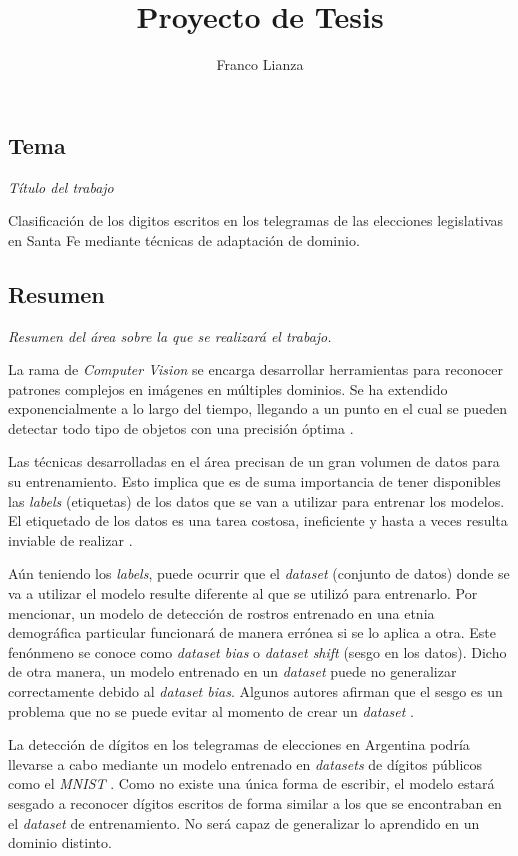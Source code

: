 \documentclass[a4paper, twoside]{report}
\title{Proyecto de Tesis}
\author{Franco Lianza}
\begin{document}

\newpage

\subsection*{Tema}
{\it Título del trabajo}

Clasificaci\'on de los digitos escritos en los telegramas de las elecciones
legislativas en Santa Fe mediante t\'ecnicas de adaptaci\'on de dominio.

\subsection*{Resumen}
{\it Resumen del área sobre la que se realizará el trabajo.}

La rama de {\it Computer Vision} se encarga desarrollar herramientas para
reconocer patrones complejos en im\'agenes en m\'ultiples dominios. Se ha
extendido exponencialmente a lo largo del tiempo, llegando a un punto en el
cual se pueden detectar todo tipo de objetos con una precisi\'on \'optima
\cite{szeliski2010computer}.

Las t\'ecnicas desarrolladas en el \'area precisan de un gran volumen de datos
para su entrenamiento. Esto implica que es de suma importancia de tener
disponibles las {\it labels} (etiquetas) de los datos que se van a utilizar
para entrenar los modelos. El etiquetado de los datos es una tarea costosa,
ineficiente y hasta a veces resulta inviable de realizar \cite{reis2022data}.

A\'un teniendo los {\it labels}, puede ocurrir que el {\it dataset} (conjunto
de datos) donde se va a utilizar el modelo resulte diferente al que se utilizó
para entrenarlo. Por mencionar, un modelo de detecci\'on de rostros entrenado
en una etnia demogr\'afica particular funcionar\'a de manera err\'onea si se lo
aplica a otra. Este fen\'onmeno se conoce como {\it dataset bias} o {\it
		dataset shift} (sesgo en los datos). Dicho de otra manera, un modelo entrenado
en un {\it dataset} puede no generalizar correctamente debido al {\it dataset
		bias}. Algunos autores afirman que el sesgo es un problema que no se puede
evitar al momento de crear un {\it dataset} \cite{khosla2012undoing}.

La detecci\'on de d\'igitos en los telegramas de elecciones en Argentina
podr\'ia llevarse a cabo mediante un modelo entrenado en {\it datasets} de
d\'igitos p\'ublicos como el {\it MNIST} \cite{lecun1998gradient}. Como no
existe una \'unica forma de escribir, el modelo estar\'a sesgado a reconocer
d\'igitos escritos de forma similar a los que se encontraban en el {\it
		dataset} de entrenamiento. No ser\'a capaz de generalizar lo aprendido en un
dominio distinto.
\end{document}
